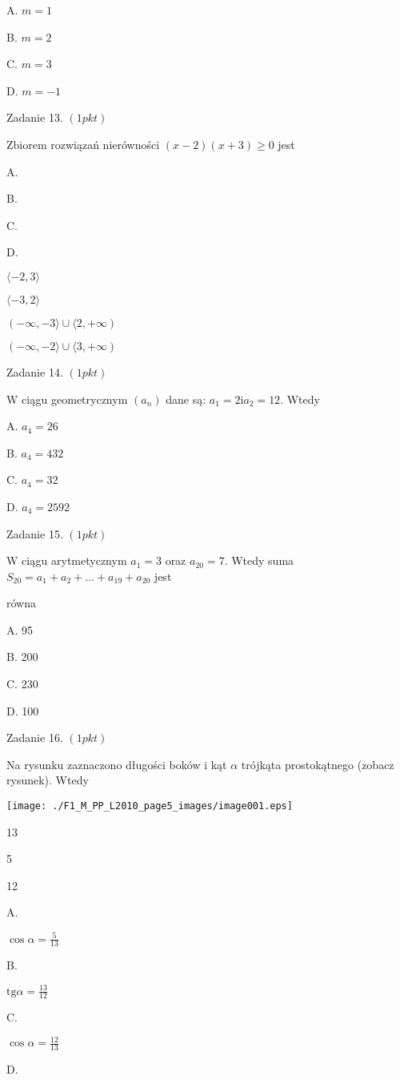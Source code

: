 \documentclass[a4paper,12pt]{article}
\begin{document}
A. $m=1$

B. $m=2$

C. $m=3$

D. $m=-1$

Zadanie 13. $(1pkt)$

Zbiorem rozwiązań nierówności $(x-2)(x+3)\geq 0$ jest

A.

B.

C.

D.

$\langle-2,3\rangle$

$\langle-3,2\rangle$

$(-\infty,-3\rangle\cup\langle 2,+\infty)$

$(-\infty,-2\rangle\cup\langle 3,+\infty)$

Zadanie 14. $(1pkt)$

$\mathrm{W}$ ciągu geometrycznym $(a_{n})$ dane są: $a_{1}=2\mathrm{i}a_{2}=12$. Wtedy

A. $a_{4}=26$

B. $a_{4}=432$

C. $a_{4}=32$

D. $a_{4}=2592$

Zadanie 15. $(1pkt)$

$\mathrm{W}$ ciągu arytmetycznym $a_{1}=3$ oraz $a_{20}=7$. Wtedy suma $S_{20}=a_{1}+a_{2}+\ldots+a_{19}+a_{20}$ jest

równa

A. 95

B. 200

C. 230

D. 100

Zadanie 16. $(1pkt)$

Na rysunku zaznaczono długości boków i kąt $\alpha$ trójkąta prostokątnego (zobacz rysunek). Wtedy
\begin{center}
\texttt{[image: ./F1\_M\_PP\_L2010\_page5\_images/image001.eps]}
\end{center}
13

5

12

A.

$\displaystyle \cos\alpha=\frac{5}{13}$

B.

$\displaystyle \mathrm{t}\mathrm{g}\alpha=\frac{13}{12}$

C.

$\displaystyle \cos\alpha=\frac{12}{13}$

D.
\end{document}
